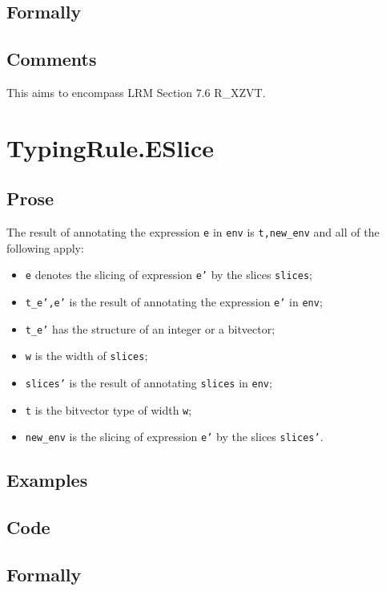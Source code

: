 \documentclass{book}
\begin{document}
  \subsection{Formally}

  \subsection{Comments}
  This aims to encompass LRM Section 7.6 R\_XZVT.

\section{TypingRule.ESlice \label{sec:TypingRule.ESlice}}

  \subsection{Prose}
  The result of annotating the expression \texttt{e} in \texttt{env} is
\texttt{t,new\_env} and all of the following apply:
  \begin{itemize}
  \item \texttt{e} denotes the slicing of expression \texttt{e'} by the slices \texttt{slices};
  \item \texttt{t\_e',e'} is the result of annotating the expression \texttt{e'} in \texttt{env};
  \item \texttt{t\_e'} has the structure of an integer or a bitvector;
  \item \texttt{w} is the width of \texttt{slices};
  \item \texttt{slices'} is the result of annotating \texttt{slices} in \texttt{env};
  \item \texttt{t} is the bitvector type of width \texttt{w};
  \item \texttt{new\_env} is the slicing of expression \texttt{e'} by the slices \texttt{slices'}.
  \end{itemize}

  \subsection{Examples}

  \subsection{Code}

  \subsection{Formally}
\end{document}

